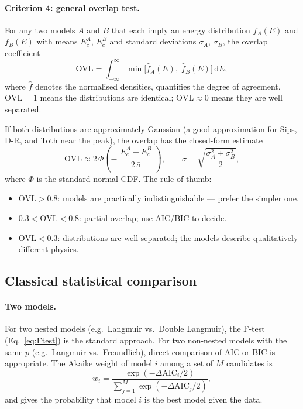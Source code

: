 \documentclass[12pt]{article}
\begin{document}
	\paragraph{Criterion 4: general overlap test.}

	For any two models $A$ and $B$ that each imply an energy
	distribution $f_A(E)$ and $f_B(E)$ with means $E_c^{A}$,
	$E_c^{B}$ and standard deviations $\sigma_A$, $\sigma_B$,
	the overlap coefficient
	\begin{equation}
		\mathrm{OVL}
		= \int_{-\infty}^{\infty}
		\min\!\bigl[\hat{f}_A(E),\;\hat{f}_B(E)\bigr]\,\mathrm{d}E,
		\label{eq:OVL}
	\end{equation}
	where $\hat{f}$ denotes the normalised densities, quantifies the
	degree of agreement. $\mathrm{OVL} = 1$ means the distributions
	are identical; $\mathrm{OVL} \approx 0$ means they are well
	separated.

	If both distributions are approximately Gaussian (a good
	approximation for Sips, D-R, and Toth near the peak), the overlap
	has the closed-form estimate
	\begin{equation}
		\mathrm{OVL}
		\approx 2\,\Phi\!\left(
		-\frac{|E_c^A - E_c^B|}{2\,\bar{\sigma}}
		\right),
		\qquad
		\bar{\sigma}
		= \sqrt{\frac{\sigma_A^2 + \sigma_B^2}{2}},
		\label{eq:OVL_gauss}
	\end{equation}
	where $\Phi$ is the standard normal CDF. The rule of thumb:
	\begin{itemize}
		\item $\mathrm{OVL} > 0.8$: models are practically
		indistinguishable --- prefer the simpler one.
		\item $0.3 < \mathrm{OVL} < 0.8$: partial overlap; use
		AIC/BIC to decide.
		\item $\mathrm{OVL} < 0.3$: distributions are well separated;
		the models describe qualitatively different physics.
	\end{itemize}

	\subsection{Classical statistical comparison}

	\paragraph{Two models.}
	For two nested models (e.g.\ Langmuir vs.\ Double Langmuir),
	the F-test (Eq.~\eqref{eq:Ftest}) is the standard approach.
	For two non-nested models with the same $p$ (e.g.\ Langmuir vs.\
	Freundlich), direct comparison of AIC or BIC is appropriate.
	The Akaike weight of model $i$ among a set of $M$ candidates is
	\begin{equation}
		w_i = \frac{\exp(-\Delta\mathrm{AIC}_i / 2)}
		{\displaystyle\sum_{j=1}^{M}
			\exp(-\Delta\mathrm{AIC}_j / 2)},
		\label{eq:Akaike_weight}
	\end{equation}
	and gives the probability that model $i$ is the best model given
	the data.
\end{document}
